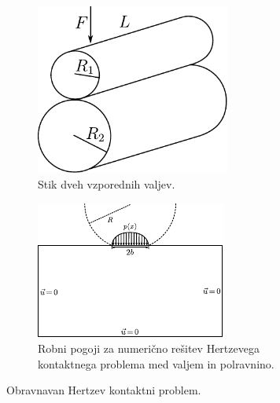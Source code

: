 \documentclass[12pt,a4paper,twoside]{article}
\theoremstyle{definition} %
\theoremstyle{plain} %
\numberwithin{equation}{section}
\begin{document}
\begin{figure}[h]
  \centering
  \begin{subfigure}[t]{0.40\textwidth}
    \includegraphics[width=0.7\textwidth]{images/hertzian_two_cylinders.pdf}
    \caption{Stik dveh vzporednih valjev.}
    \label{fig:hetzian-two-cylinders}
  \end{subfigure}
  \begin{subfigure}[t]{0.50\textwidth}
    \includegraphics[width=\textwidth]{images/hertzian_analytical_setup.pdf}
    \caption{Robni pogoji za numerično rešitev Hertzevega kontaktnega problema med valjem in
    polravnino.}
    \label{fig:hertz-analytical-setup}
  \end{subfigure}
  \caption{Obravnavan Hertzev kontaktni problem.}
  \label{fig:hertz-skica}
\end{figure}
\end{document}

